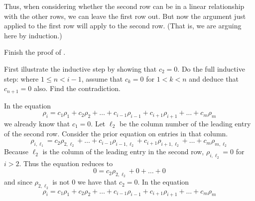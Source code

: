 \begin{exercises}
\begin{answer}
\begin{exparts}
             Thus, when considering whether the second row can be in a linear 
             relationship
             with the other rows, we can leave the first row out.
             But now the argument just applied to the first row will apply
             to the second row.
             (That is, we are arguing here by induction.)             
         \end{exparts}
      \end{answer}
  \recommended \item \label{ex:EchFormNoLinCombo} 
    Finish the proof of .
    \begin{exparts}
      \partsitem First illustrate the inductive step by showing 
         that $c_2=0$.
      \partsitem Do the full inductive step: where \( 1\leq n<i-1 \),
        assume that \( c_k=0 \)  for $1<k< n$
        and deduce that
        \( c_{n+1}=0 \) also.
      \partsitem Find the contradiction.
    \end{exparts}
    \begin{answer}
      \begin{exparts} 
        \partsitem 
          In the equation 
          \begin{equation*}
            \rho_i=c_1\rho_1+c_2\rho_2+\ldots+c_{i-1}\rho_{i-1}+
                     c_{i+1}\rho_{i+1}+\ldots+c_m\rho_m
          \end{equation*}
          we already know that $c_1=0$.
          Let $\ell_2$ be the column number of the leading entry of the
          second row. 
          Consider the prior equation on entries in that column.
          \begin{equation*}
             \rho_{i,\ell_1}=c_2\rho_{2,\ell_2}+\ldots+c_{i-1}\rho_{i-1,\ell_2}
                             +c_{i+1}\rho_{i+1,\ell_2}+\ldots+c_m\rho_{m,\ell_2}
          \end{equation*}
          Because $\ell_2$ is the column of the leading entry in the second
          row, $\rho_{i,\ell_2}=0$ for $i>2$.  
          Thus the equation reduces to  
          \begin{equation*}
             0=c_2\rho_{2,\ell_2}+0+\ldots+0
          \end{equation*}
          and since $\rho_{2,\ell_2}$ is not $0$ we have that $c_2=0$.
        \partsitem 
          In the equation 
          \begin{equation*}
            \rho_i=c_1\rho_1+c_2\rho_2+\ldots+c_{i-1}\rho_{i-1}+
                     c_{i+1}\rho_{i+1}+\ldots+c_m\rho_m

\end{equation*}
\end{exparts}
\end{answer}
\end{exercises}

